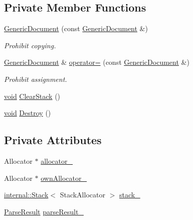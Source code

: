 \subsection*{Private Member Functions}
\begin{DoxyCompactItemize}
\item 
\hyperlink{classGenericDocument_a58dd6c300949aeb9627de7f9e34796db}{Generic\+Document} (const \hyperlink{classGenericDocument}{Generic\+Document} \&)
\begin{DoxyCompactList}\small\item\em Prohibit copying. \end{DoxyCompactList}\item 
\hyperlink{classGenericDocument}{Generic\+Document} \& \hyperlink{classGenericDocument_ae31cd36a3b677d697d0a3bed68edf3c3}{operator=} (const \hyperlink{classGenericDocument}{Generic\+Document} \&)
\begin{DoxyCompactList}\small\item\em Prohibit assignment. \end{DoxyCompactList}\item 
\hyperlink{imgui__impl__opengl3__loader_8h_ac668e7cffd9e2e9cfee428b9b2f34fa7}{void} \hyperlink{classGenericDocument_aa6f040219ed1d4cdd48f7ed9353942a4}{Clear\+Stack} ()
\item 
\hyperlink{imgui__impl__opengl3__loader_8h_ac668e7cffd9e2e9cfee428b9b2f34fa7}{void} \hyperlink{classGenericDocument_ad72f36087f5129ad4b5321cf8418c923}{Destroy} ()
\end{DoxyCompactItemize}
\subsection*{Private Attributes}
\begin{DoxyCompactItemize}
\item 
Allocator $\ast$ \hyperlink{classGenericDocument_a9b5f15fc75c8035612c37f796548e87a}{allocator\+\_\+}
\item 
Allocator $\ast$ \hyperlink{classGenericDocument_ada153f6865201106b3a753861c870266}{own\+Allocator\+\_\+}
\item 
\hyperlink{classinternal_1_1Stack}{internal\+::\+Stack}$<$ Stack\+Allocator $>$ \hyperlink{classGenericDocument_ad2169359326bdf8a7180338fec77e77f}{stack\+\_\+}
\item 
\hyperlink{structParseResult}{Parse\+Result} \hyperlink{classGenericDocument_a499058f1c615928337d96cfaf374373e}{parse\+Result\+\_\+}
\end{DoxyCompactItemize}
